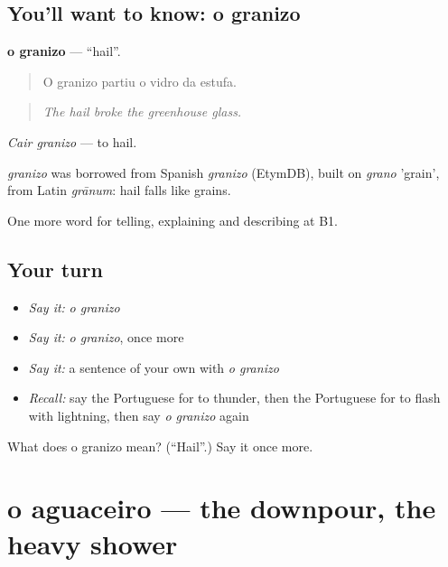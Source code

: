 \subsection*{You'll want to know: o granizo}
\textbf{o granizo} — \textquotedblleft{}hail\textquotedblright{}.

\begin{quote}
O granizo partiu o vidro da estufa.
\end{quote}

\begin{quote}
\emph{The hail broke the greenhouse glass.}
\end{quote}

\emph{Cair granizo} — to hail.

\begin{cousinweb}
\emph{granizo} was borrowed from Spanish \emph{granizo} (EtymDB), built on \emph{grano} 'grain', from Latin \emph{grānum}: hail falls like grains.
\end{cousinweb}

\begin{grammarlens}[title={What you've built}]
One more word for telling, explaining and describing at B1.
\end{grammarlens}

\subsection*{Your turn}
\begin{itemize}
\raggedright
  \item \emph{Say it:} \emph{o granizo}
  \item \emph{Say it:} \emph{o granizo}, once more
  \item \emph{Say it:} a sentence of your own with \emph{o granizo}
  \item \emph{Recall:} say the Portuguese for to thunder, then the Portuguese for to flash with lightning, then say \emph{o granizo} again
\end{itemize}

\begin{tcolorbox}[breakable,colback=teal!4,colframe=teal!35!black,title={Before you move on}]
What does o granizo mean? (\textquotedblleft{}Hail\textquotedblright{}.) Say it once more.
\end{tcolorbox}
\section[o aguaceiro]{o aguaceiro — the downpour, the heavy shower}

